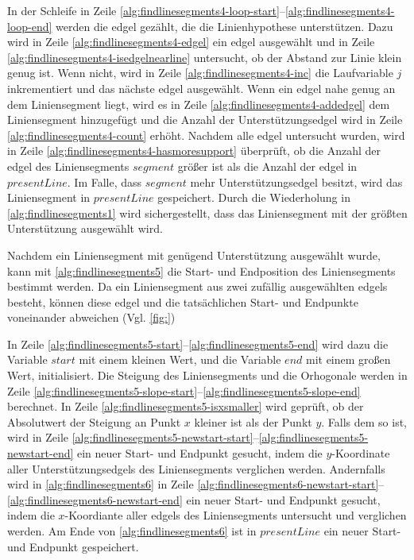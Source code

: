 

In der Schleife in Zeile \ref{alg:findlinesegments4-loop-start}--\ref{alg:findlinesegments4-loop-end} werden die
 \gls{edgel} gezählt, die die Linienhypothese unterstützen. Dazu wird in Zeile \ref{alg:findlinesegments4-edgel} ein
 \gls{edgel} ausgewählt und in Zeile \ref{alg:findlinesegments4-isedgelnearline} untersucht, ob der Abstand zur Linie
 klein genug ist. Wenn nicht, wird in Zeile \ref{alg:findlinesegments4-inc} die Laufvariable $j$ inkrementiert und das
 nächste \gls{edgel} ausgewählt. Wenn ein \gls{edgel} nahe genug an dem Liniensegment liegt, wird es in Zeile
 \ref{alg:findlinesegments4-addedgel} dem Liniensegment hinzugefügt und die Anzahl der Unterstützungsedgel wird in
 Zeile \ref{alg:findlinesegments4-count} erhöht. Nachdem alle \gls{edgel} untersucht wurden, wird in Zeile
 \ref{alg:findlinesegments4-hasmoresupport} überprüft, ob die Anzahl der \gls{edgel} des Liniensegments
 $\mathit{segment}$ größer ist als die Anzahl der \gls{edgel} in $\mathit{presentLine}$. Im Falle, dass
 $\mathit{segment}$ mehr Unterstützungsedgel besitzt, wird das Liniensegment in $\mathit{presentLine}$ gespeichert.
 Durch die Wiederholung in \autoref{alg:findlinesegments1} wird sichergestellt, dass das Liniensegment mit der
 größten Unterstützung ausgewählt wird.

Nachdem ein Liniensegment mit genügend Unterstützung ausgewählt wurde, kann mit \autoref{alg:findlinesegments5} die
 Start- und Endposition des Liniensegments bestimmt werden. Da ein Liniensegment aus zwei zufällig ausgewählten
 \glspl{edgel} besteht, können diese \gls{edgel} und die tatsächlichen Start- und Endpunkte voneinander abweichen
 (Vgl. \autoref{fig:})



In Zeile \ref{alg:findlinesegments5-start}--\ref{alg:findlinesegments5-end} wird dazu die Variable $\mathit{start}$ mit
 einem kleinen Wert, und die Variable $\mathit{end}$ mit einem großen Wert, initialisiert. Die Steigung des
 Liniensegments und die Orhogonale werden in Zeile
 \ref{alg:findlinesegments5-slope-start}--\ref{alg:findlinesegments5-slope-end} berechnet. In Zeile
 \ref{alg:findlinesegments5-isxsmaller} wird geprüft, ob der Absolutwert der Steigung an Punkt $x$ kleiner ist als der
 Punkt $y$. Falls dem so ist, wird in Zeile
 \ref{alg:findlinesegments5-newstart-start}--\ref{alg:findlinesegments5-newstart-end} ein neuer Start- und Endpunkt
 gesucht, indem die $y$-Koordinate aller Unterstützungsedgels des Liniensegments verglichen werden. Andernfalls wird in
 \autoref{alg:findlinesegments6} in Zeile
 \ref{alg:findlinesegments6-newstart-start}--\ref{alg:findlinesegments6-newstart-end} ein neuer Start- und Endpunkt
 gesucht, indem die $x$-Koordiante aller \glspl{edgel} des Liniensegments untersucht und verglichen werden. Am Ende von
 \autoref{alg:findlinesegments6} ist in $\mathit{presentLine}$ ein neuer Start- und Endpunkt gespeichert.

